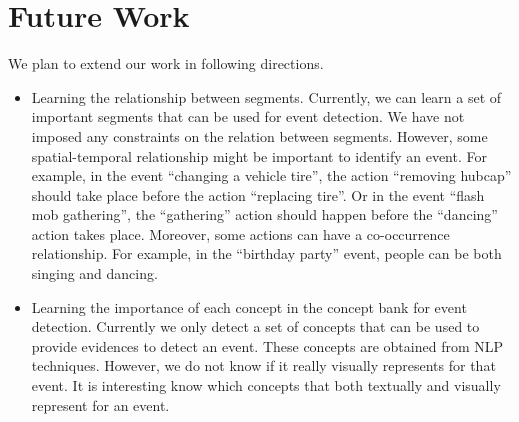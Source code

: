 \section{Future Work}
We plan to extend our work in following directions.
\begin{itemize}
	\item Learning the relationship between segments. Currently, we can learn a set of important segments that can be used for event detection. We have not imposed any constraints on the relation between segments. However, some spatial-temporal relationship might be important to identify an event. For example, in the event ``changing a vehicle tire'', the action ``removing hubcap'' should take place before the action ``replacing tire''. Or in the event ``flash mob gathering'', the ``gathering'' action should happen before the ``dancing'' action takes place. Moreover, some actions can have a co-occurrence relationship. For example, in the ``birthday party'' event, people can be both singing and dancing. 
	\item Learning the importance of each concept in the concept bank for event detection. Currently we only detect a set of concepts that can be used to provide evidences to detect an event. These concepts are obtained from NLP techniques. However, we do not know if it really visually represents for that event. It is interesting know which concepts that both textually and visually represent for an event.
\end{itemize}
